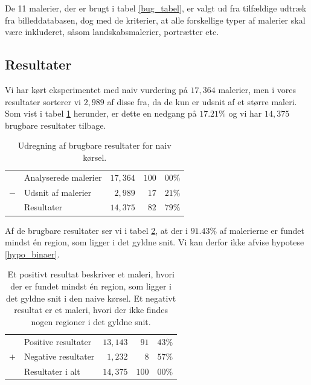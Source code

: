 {De 11 malerier, der er brugt i tabel \ref{bug_tabel}, er valgt ud fra
tilfældige udtræk fra billeddatabasen, dog med de kriterier, at alle
forskellige typer af malerier skal være inkluderet, såsom landskabsmalerier,
portrætter etc.

\subsection{Resultater}
Vi har kørt eksperimentet med naiv vurdering på $17,364$ malerier, men i
vores resultater sorterer vi $2,989$ af disse fra, da de kun er udsnit
af et større maleri.  Som vist i tabel \ref{tabel_fjern_detaljer}
herunder, er dette en nedgang på $17.21 \%$ og vi har $14,375$
brugbare resultater tilbage.

\begin{table}[H]
    \centering
    \begin{tabular}{r@{\ \ }p{12em}r|r@{.}l}
            & Analyserede malerier & $17,364$ & $100$ & $00\%$   \\
        $-$ & Udsnit af malerier   &  $2,989$ &  $17$ & $21\%$   \\\hline
            & Resultater           & $14,375$ &  $82$ & $79\%$
    \end{tabular}
    \caption[]{Udregning af brugbare resultater for naiv kørsel.}
    \label{tabel_fjern_detaljer}
\end{table}

Af de brugbare resultater ser vi i tabel \ref{tabel_fordeling}, at der
i $91.43 \%$ af malerierne er fundet mindst én region, som ligger i
det gyldne snit. Vi kan derfor ikke afvise hypotese \ref{hypo_binaer}.

\begin{table}[H]
    \centering
    \begin{tabular}{r@{\ \ }p{12em}r|r@{.}l}
            & Positive resultater   & $13,143$ &  $91$ & $43\%$ \\
        $+$ & Negative resultater   &  $1,232$ &   $8$ & $57\%$ \\\hline
            & Resultater i alt      & $14,375$ & $100$ & $00\%$
    \end{tabular}
    \caption[]{Et positivt resultat beskriver et maleri, hvori der er
    fundet mindst én region, som ligger i det gyldne snit i den naive
    kørsel. Et negativt resultat er et maleri, hvori der ikke findes
    nogen regioner i det gyldne snit.}
    \label{tabel_fordeling}
\end{table}

}
